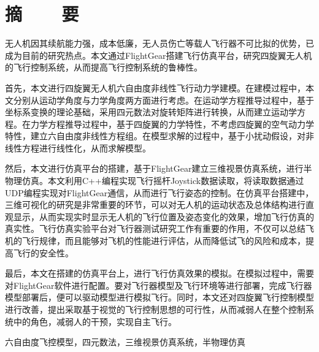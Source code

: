 ﻿%
%
%


%
%
\renewcommand{\baselinestretch}{1.5}
\fontsize{12pt}{13pt}\selectfont

\chapter{摘~~~~要}
无人机因其续航能力强，成本低廉，无人员伤亡等载人飞行器不可比拟的优势，已成为目前的研究热点。本文通过FlightGear搭建飞行仿真平台，研究四旋翼无人机的飞行控制系统，从而提高飞行控制系统的鲁棒性。

首先，本文进行四旋翼无人机六自由度非线性飞行动力学建模。在建模过程中，本文分别从运动学角度与力学角度两方面进行考虑。在运动学方程推导过程中，基于坐标系变换的理论基础，采用四元数法对旋转矩阵进行转换，从而建立运动学方程。在力学方程推导过程中，基于四旋翼的力学特性，不考虑四旋翼的空气动力学特性，建立六自由度非线性方程组。在模型求解的过程中，基于小扰动假设，对非线性方程进行线性化，从而求解模型。

然后，本文进行仿真平台的搭建，基于FlightGear建立三维视景仿真系统，进行半物理仿真。本文利用C++编程实现飞行摇杆Joystick数据读取，将读取数据通过UDP编程实现对FlightGear通信，从而进行飞行姿态的控制。在仿真平台搭建中，三维可视化的研究是非常重要的环节，可以对无人机的运动状态及总体结构进行直观显示，从而实现实时显示无人机的飞行位置及姿态变化的效果，增加飞行仿真的真实性。飞行仿真实验平台对飞行器测试研究工作有重要的作用，不仅可以总结飞机的飞行规律，而且能够对飞机的性能进行评估，从而降低试飞的风险和成本，提高飞行的安全性。

最后，本文在搭建的仿真平台上，进行飞行仿真效果的模拟。在模拟过程中，需要对FlightGear软件进行配置。要对飞行器模型及飞行环境等进行部署，完成飞行器模型部署后，便可以驱动模型进行模拟飞行。同时，本文还对四旋翼飞行控制模型进行改善，提出采取基于视觉的飞行控制思想的可行性，从而减弱人在整个控制系统中的角色，减弱人的干预，实现自主飞行。

\vspace{1em}
 六自由度飞控模型，四元数法，三维视景仿真系统，半物理仿真


